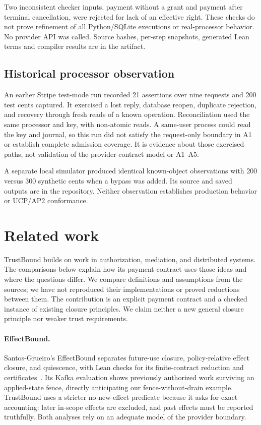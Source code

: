 \documentclass[letterpaper]{article}
\begin{document}
Two inconsistent checker inputs, payment without a grant and payment after
terminal cancellation, were rejected for lack of an effective right. These
checks do not prove refinement of all Python/SQLite executions or real-processor
behavior. No provider API was called. Source hashes, per-step snapshots,
generated Lean terms and compiler results are in the artifact.

\subsection{Historical processor observation}
An earlier Stripe test-mode run recorded 21 assertions over nine requests and
200 test cents captured. It exercised a lost reply, database reopen, duplicate
rejection, and recovery through fresh reads of a known operation. Reconciliation
used the same processor and key, with non-atomic reads. A same-user process
could read the key and journal, so this run did not satisfy the request-only
boundary in A1 or establish complete admission coverage. It is evidence about
those exercised paths, not validation of the provider-contract model or A1--A5.

A separate local simulator produced identical known-object observations with
200 versus 300 synthetic cents when a bypass was added. Its source and saved
outputs are in the repository. Neither observation establishes production
behavior or UCP/AP2 conformance.

\section{Related work}
\label{sec:related}
TrustBound builds on work in authorization, mediation, and distributed systems.
The comparisons below explain how its payment contract uses those ideas and
where the questions differ. We compare definitions and assumptions from the
sources; we have not reproduced their implementations or proved reductions
between them. The contribution is an explicit payment contract and a checked
instance of existing closure principles. We claim neither a new general closure
principle nor weaker trust requirements.

\paragraph{EffectBound.}
Santos-Grueiro's EffectBound separates future-use closure, policy-relative
effect closure, and quiescence, with Lean checks for its finite-contract
reduction and certificates~\citep{effectbound}. Its Kafka evaluation shows
previously authorized work surviving an applied-state fence, directly
anticipating our fence-without-drain example. TrustBound uses a stricter
no-new-effect predicate because it asks for exact accounting: later in-scope
effects are excluded, and past effects must be reported truthfully. Both
analyses rely on an adequate model of the provider boundary.
\end{document}
